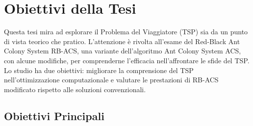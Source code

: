 
\section{Obiettivi della Tesi}



Questa tesi mira ad esplorare il Problema del Viaggiatore (TSP) sia da un punto di vista teorico che pratico. L'attenzione è rivolta all'esame del Red-Black Ant Colony System \Gls{RB-ACS}, una variante dell'algoritmo Ant Colony System \Gls{ACS}, con alcune modifiche, per comprenderne l'efficacia nell'affrontare le sfide del \Gls{TSP}.  Lo studio ha due obiettivi: migliorare la comprensione del \Gls{TSP} nell'ottimizzazione computazionale e valutare le prestazioni di \Gls{RB-ACS} modificato rispetto alle soluzioni convenzionali.

\subsection{Obiettivi Principali}

